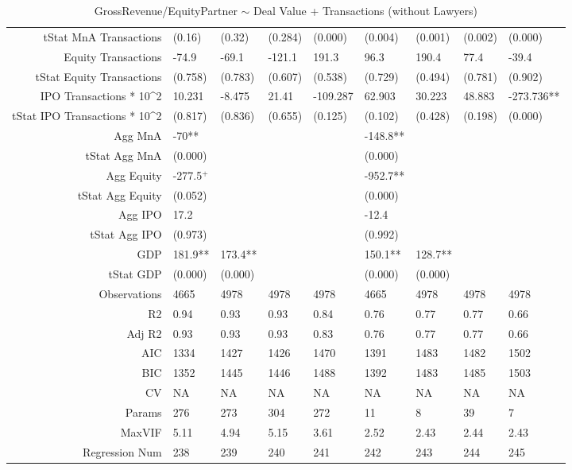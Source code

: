 \begin{table}[ht]
\begin{tabular}{rllllllll}
  tStat MnA Transactions & (0.16) & (0.32) & (0.284) & (0.000) & (0.004) & (0.001) & (0.002) & (0.000) \\ 
  Equity Transactions & -74.9 & -69.1 & -121.1 & 191.3 & 96.3 & 190.4 & 77.4 & -39.4 \\ 
  tStat Equity Transactions & (0.758) & (0.783) & (0.607) & (0.538) & (0.729) & (0.494) & (0.781) & (0.902) \\ 
  IPO Transactions * 10^2 & 10.231 & -8.475 & 21.41 & -109.287 & 62.903 & 30.223 & 48.883 & -273.736** \\ 
  tStat IPO Transactions * 10^2 & (0.817) & (0.836) & (0.655) & (0.125) & (0.102) & (0.428) & (0.198) & (0.000) \\ 
  Agg MnA & -70** &  &  &  & -148.8** &  &  &  \\ 
  tStat Agg MnA & (0.000) &  &  &  & (0.000) &  &  &  \\ 
  Agg Equity & -277.5$^{+}$ &  &  &  & -952.7** &  &  &  \\ 
  tStat Agg Equity & (0.052) &  &  &  & (0.000) &  &  &  \\ 
  Agg IPO & 17.2 &  &  &  & -12.4 &  &  &  \\ 
  tStat Agg IPO & (0.973) &  &  &  & (0.992) &  &  &  \\ 
  GDP & 181.9** & 173.4** &  &  & 150.1** & 128.7** &  &  \\ 
  tStat GDP & (0.000) & (0.000) &  &  & (0.000) & (0.000) &  &  \\ 
  Observations & 4665 & 4978 & 4978 & 4978 & 4665 & 4978 & 4978 & 4978 \\ 
  R2 & 0.94 & 0.93 & 0.93 & 0.84 & 0.76 & 0.77 & 0.77 & 0.66 \\ 
  Adj R2 & 0.93 & 0.93 & 0.93 & 0.83 & 0.76 & 0.77 & 0.77 & 0.66 \\ 
  AIC & 1334 & 1427 & 1426 & 1470 & 1391 & 1483 & 1482 & 1502 \\ 
  BIC & 1352 & 1445 & 1446 & 1488 & 1392 & 1483 & 1485 & 1503 \\ 
  CV & NA & NA & NA & NA & NA & NA & NA & NA \\ 
  Params & 276 & 273 & 304 & 272 & 11 & 8 & 39 & 7 \\ 
  MaxVIF & 5.11 & 4.94 & 5.15 & 3.61 & 2.52 & 2.43 & 2.44 & 2.43 \\ 
  Regression Num & 238 & 239 & 240 & 241 & 242 & 243 & 244 & 245 \\ 
   \hline
\end{tabular}
\caption{GrossRevenue/EquityPartner $\sim$ Deal Value + Transactions (without Lawyers)} 
\end{table}
